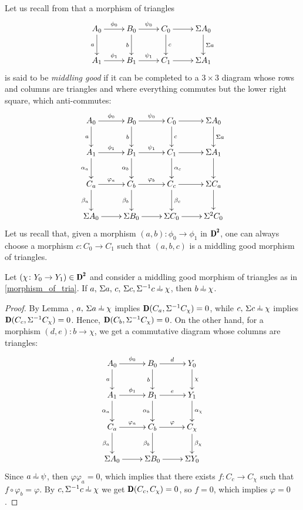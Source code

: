 Let us recall from \cite{neeman:new-axioms} that a morphism of triangles
\begin{equation}\label{morphism_of_tria}\xymatrix{
A_0\ar[r]^{ \phi_0 }\ar[d]_a&B_0\ar[r]^{ \psi_0 }\ar[d]_b&C_0\ar[r]\ar[d]^c&\Sigma A_0\ar[d]^{\Sigma a}\\
A_1\ar[r]^{ \phi_1 }&B_1\ar[r]^{ \psi_1 }&C_1\ar[r]&\Sigma A_1}\end{equation}
is said to be {\em middling good} if it can be completed to a $3\times 3$ diagram whose rows and columns are triangles and where everything commutes but the lower right square, which anti-commutes:
\begin{equation}\label{3x3}
\xymatrix{
A_0\ar[r]^{ \phi_0 }\ar[d]_a&B_0\ar[r]^{ \psi_0 }\ar[d]_b&C_0\ar[r]\ar[d]^c&\Sigma A_0\ar[d]^{\Sigma a}\\
A_1\ar[d]_{\alpha_a}\ar[r]^{ \phi_1 }&B_1\ar[d]_{\alpha_b}\ar[r]^{ \psi_1 }&C_1\ar[r]\ar[d]^{\alpha_c}&\Sigma A_1\ar[d]\\
C_a\ar[r]^{\varphi_a}\ar[d]_{\beta_a}&C_b\ar[r]^{\varphi_b}\ar[d]_{\beta_b}&C_c\ar[r]\ar[d]^{\beta_c}&\Sigma C_a\ar[d]^{}\\
\Sigma A_0\ar[r]&\Sigma B_0\ar[r]_{}&\Sigma C_0\ar[r]&\Sigma^2 C_0
}
\end{equation}
Let us recall that, given a morphism $(a,b)\colon  \phi_0 \to  \phi_1 $ in $\cD^\due$, one can always choose a morphism $c\colon C_0\to C_1$ such that $(a,b,c)$ is a middling good morphism of triangles.
\begin{lemma}\label{extension}
Let $(\chi\colon  Y_0 \to  Y_1 )\in\cD^\due$ and consider a middling good morphism of triangles as in \eqref{morphism_of_tria}.
If $a,\, \Sigma a,\, c,\, \Sigma c, \Sigma^{-1}c\horth \chi$, then $b\horth \chi$.
\end{lemma}
\begin{proof}
By Lemma , $a,\, \Sigma a\horth \chi$ implies $\cD(C_a,\Sigma^{-1}C_\chi)=0$, while  $c,\, \Sigma c\horth \chi$ implies $\cD(C_c,\Sigma^{-1}C_\chi)=0$. Hence,  $\cD(C_b,\Sigma^{-1}C_\chi)=0$. On the other hand, for a morphism $(d,e)\colon b\to \chi$, we get a commutative diagram whose columns are triangles:
$$\xymatrix{
A_0\ar[r]^{ \phi_0 }\ar[d]_a&B_0\ar[r]^d\ar[d]_b& Y_0 \ar[d]^\chi\\
A_1\ar[r]^{ \phi_1 }\ar[d]_{\alpha_a}&B_1\ar[r]^e\ar[d]_{\alpha_b}& Y_1 \ar[d]^{\alpha_\chi}\\
C_a\ar[r]^{\varphi_a}\ar[d]_{\beta_a}&C_b\ar[r]^{\varphi}\ar[d]_{\beta_b}&C_\chi\ar[d]^{\beta_\chi}\\
\Sigma A_0\ar[r]&\Sigma B_0\ar[r]&\Sigma  Y_0
}$$
Since $a\horth \psi$, then $\varphi\varphi_a=0$, which implies that there exists $f\colon C_c\to C_\chi$ such that $f\circ \varphi_b=\varphi$. By $c, \Sigma^{-1}c\horth \chi$ we get $\cD(C_c,C_{\chi})=0$, so $f=0$, which implies $\varphi=0$.
\end{proof}

